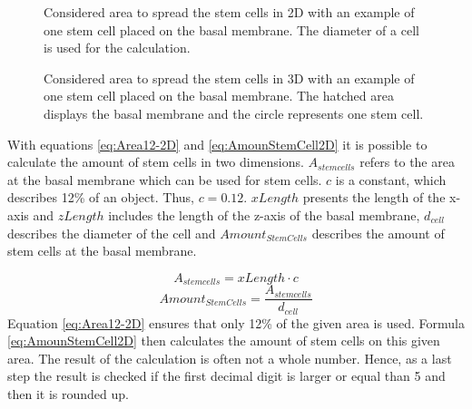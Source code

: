 \begin{figure}[ht]
\begin{center}
\caption[Considered area to spread the stem cells in two dimensions]{Considered area to spread the stem cells in 2D with an example of one stem cell placed on the basal membrane. The diameter of a cell is used for the calculation.}
\label{tikz:AreaIn2D}
\end{center}
\end{figure}


\begin{figure}[ht]
\begin{center}
\caption[Considered area to spread the stem cells in three dimensions]{Considered area to spread the stem cells in 3D with an example of one stem cell placed on the basal membrane. The hatched area displays the basal membrane and the circle represents one stem cell.}
\label{tikz:AreaIn3D}
\end{center}
\end{figure}


With equations \ref{eq:Area12-2D} and \ref{eq:AmounStemCell2D} it is possible to calculate the amount of stem cells in two dimensions. $A_{stem cells}$ refers to the area at the basal membrane which can be used for stem cells. $c$ is a constant, which describes 12\% of an object. Thus, $c=0.12$. $xLength$ presents the length of the x-axis and $zLength$ includes the length of the z-axis of the basal membrane, $d_{cell}$ describes the diameter of the cell and $Amount_{StemCells}$ describes the amount of stem cells at the basal membrane.

\begin{equation}\label{eq:Area12-2D}
A_{stem cells} = xLength \cdot c
\end{equation}
\begin{equation}\label{eq:AmounStemCell2D}
Amount_{StemCells} = \dfrac{A_{stem cells}}{d_{cell}} 
\end{equation}
Equation \ref{eq:Area12-2D} ensures that only 12\% of the given area is used. Formula \ref{eq:AmounStemCell2D} then calculates the amount of stem cells on this given area. The result of the calculation is often not a whole number. Hence, as a last step the result is checked if the first decimal digit is larger or equal than 5 and then it is rounded up.


